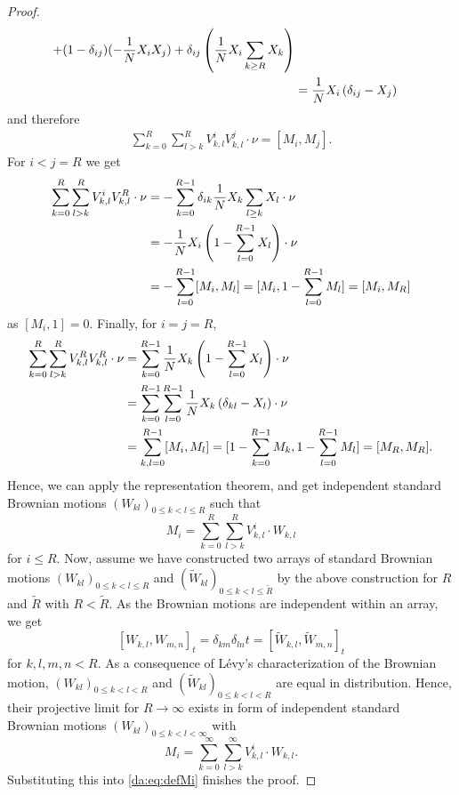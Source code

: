 \begin{proof}
\begin{align*}
 + (1-\delta_{ij})(- \frac{1}{N} X_{i} X_{j})
 + \delta_{ij} \left( \frac{1}{N} X_{i} \sum_{k \geq R} X_{k} \right) \\
&= \frac{1}{N} X_{i} \left( \delta_{ij} - X_{j} \right)
\end{align*} 
and therefore
\begin{align*}
\sum_{k=0}^R \sum_{l>k}^R V_{k,l}^i V_{k,l}^j \cdot \nu
= [M_i,M_j].
\end{align*}
For $i < j = R$ we get
\begin{align*}
\sum_{k=0}^R \sum_{l>k}^R V_{k,l}^i V_{k,l}^R \cdot \nu
&= - \sum_{k=0}^{R-1} \delta_{ik} \frac{1}{N} X_{k} \sum_{l \geq k} X_{l}
 \cdot \nu\\ 
&= - \frac{1}{N} X_{i} \left(1-\sum_{l=0}^{R-1}X_{l}\right) \cdot \nu \\
&= - \sum_{l=0}^{R-1}[M_i,M_l] = [M_i,1-\sum_{l=0}^{R-1} M_l] = [M_i,M_R]
\end{align*}
as $[M_i,1] = 0$. Finally, for $i = j = R$,
\begin{align*}
\sum_{k=0}^R \sum_{l>k}^R V_{k,l}^R V_{k,l}^R \cdot \nu
&= \sum_{k=0}^{R-1} \frac{1}{N} X_{k} \left( 1 - \sum_{l=0}^{R-1} X_{l} \right) \cdot\nu\\ 
&= \sum_{k=0}^{R-1} \sum_{l=0}^{R-1} \frac{1}{N} X_{k} \left( \delta_{kl} - X_{l} \right)
	\cdot \nu \\   
&= \sum_{k,l=0}^{R-1} [M_i,M_l] = [1-\sum_{k=0}^{R-1} M_k,1-\sum_{l=0}^{R-1} M_l] = [M_R,M_R].
\end{align*}
Hence, we can apply the representation theorem, and get independent standard Brownian motions
$(W_{kl})_{0 \leq k < l \leq R}$ such that 
\[ M_i = \sum_{k=0}^{R} \sum_{l>k}^{R} V_{k,l}^i \cdot W_{k,l} \]
for $i \leq R$. Now, assume we have constructed two arrays of standard Brownian
motions $(W_{kl})_{0 \leq k < l \leq R}$ and $(\widetilde{W}_{kl})_{0 \leq k < l \leq \widetilde{R}}$ by the above
construction for $R$ and $\widetilde{R}$ with $R < \widetilde{R}$. As the Brownian motions are
independent within an array, we get
$$ [W_{k,l},W_{m,n}]_t = \delta_{km} \delta_{ln} t = [\widetilde{W}_{k,l},\widetilde{W}_{m,n}]_t $$
for $k,l,m,n < R$. As a consequence of Lévy's characterization of the Brownian motion, 
$(W_{kl})_{0 \leq k < l < R}$ and $(\widetilde{W}_{kl})_{0 \leq k < l < R}$ are equal in
distribution. Hence, their projective limit for $R \to \infty$ exists in form of independent
standard Brownian motions $(W_{kl})_{0 \leq k < l < \infty}$ with
$$ M_i = \sum_{k=0}^{\infty} \sum_{l>k}^{\infty} V_{k,l}^i \cdot W_{k,l}. $$
Substituting this into \eqref{da:eq:defMi} finishes the proof.
\end{proof}



